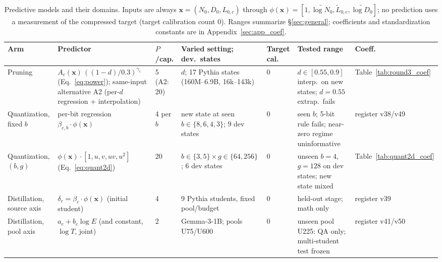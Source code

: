 \begin{table}[t]\centering\footnotesize\setlength{\tabcolsep}{3pt}
\begin{tabular}{@{}p{1.8cm}p{3.6cm}p{0.8cm}p{2.5cm}p{0.7cm}p{2.2cm}p{1.2cm}@{}}
\toprule
Arm & Predictor & $P$/cap. & Varied setting; dev.\ states & Target cal. & Tested range & Coeff. \\
\midrule
Pruning & $A_c(\mathbf x)\,((1-d)/0.3)^{\gamma_c}$ (Eq.~\ref{eq:power}); same-input alternative A2 (per-$d$ regression + interpolation) & 5 (A2: 20) & $d$; 17 Pythia states (160M--6.9B, 16k--143k) & 0 & $d\in[0.55,0.9]$ interp.\ on new states; $d=0.55$ extrap.\ fails & Table~\ref{tab:round3_coef} \\
Quantization, fixed $b$ & per-bit regression $\beta_{c,b}\cdot\phi(\mathbf x)$ & 4 per $b$ & new state at seen $b\in\{8,6,4,3\}$; 9 dev states & 0 & seen $b$; 5-bit rule fails; near-zero regime uninformative & register v38/v49 \\
Quantization, $(b,g)$ & $\phi(\mathbf x)\cdot[1,u,v,uv,u^2]$ (Eq.~\ref{eq:quant2d}) & 20 & $b\in\{3,5\}\times g\in\{64,256\}$; 6 dev states & 0 & unseen $b=4$, $g=128$ on dev states; new state mixed & Table~\ref{tab:quant2d_coef} \\
Distillation, source axis & $\delta_c=\beta_c\cdot\phi(\mathbf x)$ (initial student) & 4 & 9 Pythia students, fixed pool/budget & 0 & held-out stage; math only & register v39 \\
Distillation, pool axis & $a_c+b_c\log E$ (and constant, $\log T$, joint) & 2 & Gemma-3-1B; pools U75/U600 & 0 & unseen pool U225: QA only; multi-student test frozen & register v41/v50 \\
\bottomrule\end{tabular}
\caption{Predictive models and their domains. Inputs are always $\mathbf x=(N_0,D_0,L_{0,c})$ through $\phi(\mathbf x)=[1,\tilde{\log N_0},\tilde L_{0,c},\tilde{\log D_0}]$; no prediction uses a measurement of the compressed target (target calibration count 0). Ranges summarize \S\ref{sec:general}; coefficients and standardization constants are in Appendix~\ref{sec:app_coef}.}
\label{tab:models}\end{table}
